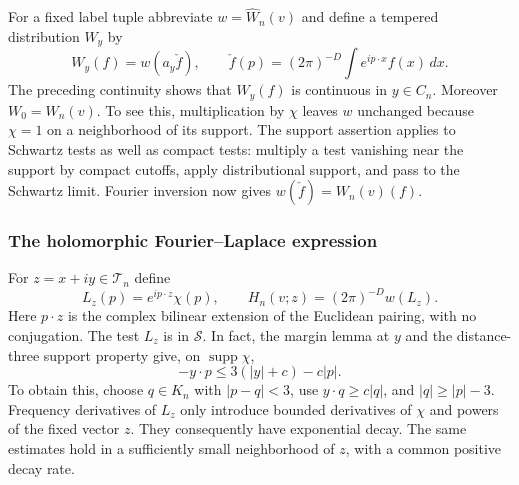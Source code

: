 For a fixed label tuple abbreviate $w=\widehat W_n(v)$ and define a
tempered distribution $W_y$ by
\begin{equation}\label{eq:partial-damping}
 W_y(f)=w(a_y\check f),\qquad
 \check f(p)=(2\pi)^{-D}\int e^{ip\cdot x}f(x)\,dx.
\end{equation}
The preceding continuity shows that $W_y(f)$ is continuous in
$y\in C_n$. Moreover $W_0=W_n(v)$. To see this, multiplication by
$\chi$ leaves $w$ unchanged because $\chi=1$ on a neighborhood of
its support. The support assertion applies to Schwartz tests as well as
compact tests: multiply a test vanishing near the support by compact
cutoffs, apply distributional support, and pass to the Schwartz limit.
Fourier inversion now gives $w(\check f)=W_n(v)(f)$.

\subsubsection{The holomorphic Fourier--Laplace expression}
For $z=x+iy\in\mathcal T_n$ define
\[
 L_z(p)=e^{ip\cdot z}\chi(p),\qquad
 H_n(v;z)=(2\pi)^{-D}w(L_z).
\]
Here $p\cdot z$ is the complex bilinear extension of the Euclidean
pairing, with no conjugation. The test $L_z$ is in $\mathscr S$.
In fact, the margin lemma at $y$ and the distance-three support property
give, on $\operatorname{supp}\chi$,
\[
 -y\cdot p\leq3(|y|+c)-c|p|.
\]
To obtain this, choose $q\in K_n$ with $|p-q|<3$, use
$y\cdot q\geq c|q|$, and $|q|\geq|p|-3$.
Frequency derivatives of $L_z$ only introduce bounded derivatives of
$\chi$ and powers of the fixed vector $z$. They consequently have
exponential decay. The same estimates hold in a sufficiently small
neighborhood of $z$, with a common positive decay rate.

